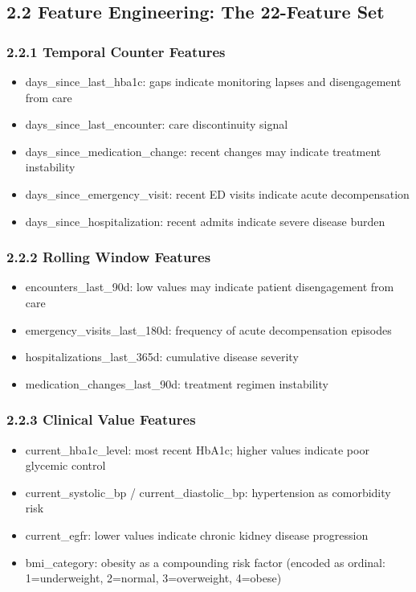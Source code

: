 \documentclass[11pt,a4paper]{article}
\begin{document}
\subsection{2.2 Feature Engineering: The 22-Feature Set}

\subsubsection{2.2.1 Temporal Counter Features}
\begin{itemize}
\item days\_since\_last\_hba1c: gaps indicate monitoring lapses and disengagement from care
\item days\_since\_last\_encounter: care discontinuity signal
\item days\_since\_medication\_change: recent changes may indicate treatment instability
\item days\_since\_emergency\_visit: recent ED visits indicate acute decompensation
\item days\_since\_hospitalization: recent admits indicate severe disease burden
\end{itemize}

\subsubsection{2.2.2 Rolling Window Features}
\begin{itemize}
\item encounters\_last\_90d: low values may indicate patient disengagement from care
\item emergency\_visits\_last\_180d: frequency of acute decompensation episodes
\item hospitalizations\_last\_365d: cumulative disease severity
\item medication\_changes\_last\_90d: treatment regimen instability
\end{itemize}

\subsubsection{2.2.3 Clinical Value Features}
\begin{itemize}
\item current\_hba1c\_level: most recent HbA1c; higher values indicate poor glycemic control
\item current\_systolic\_bp / current\_diastolic\_bp: hypertension as comorbidity risk
\item current\_egfr: lower values indicate chronic kidney disease progression
\item bmi\_category: obesity as a compounding risk factor (encoded as ordinal: 1=underweight, 2=normal, 3=overweight, 4=obese)
\end{itemize}
\end{document}
